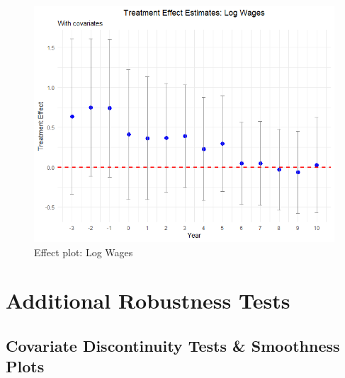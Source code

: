 \begin{figure}[htbp]
    \centering
    \includegraphics[width=\textwidth,keepaspectratio]{images/tes_ln_wages.png}
    \caption{Effect plot: Log Wages}
    \label{fig:tes_ln_wages}
\end{figure}


\clearpage

\section{Additional Robustness Tests} \label{sec:appxb}

\subsection{Covariate Discontinuity Tests \& Smoothness Plots}

